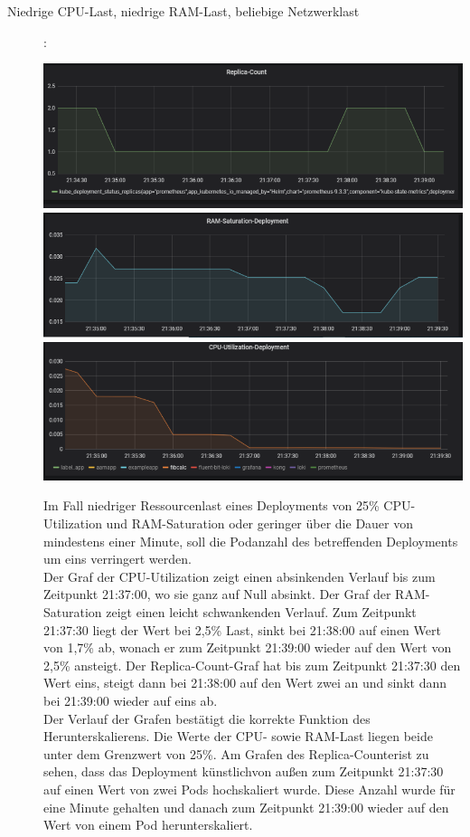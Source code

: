 \documentclass[a4paper,10pt]{scrartcl}
\begin{document}
\begin{description}

\item[Niedrige CPU-Last, niedrige RAM-Last, beliebige Netzwerklast]:\\

\begin{minipage}{\linewidth}
            \includegraphics[width=.5\textwidth]{img/Herunterskalieren/ReplicaCount.PNG}
            \includegraphics[scale=1,width=.5\textwidth,height=.14\textheight]{img/Herunterskalieren/RAMSaturation.PNG}
  			\includegraphics[scale=1,width=.5\textwidth]{img/Herunterskalieren/CPUSaturation.PNG}			
\end{minipage}

Im Fall niedriger Ressourcenlast eines Deployments von 25\% CPU-Utilization und RAM-Saturation oder geringer über die Dauer von mindestens einer Minute, soll die Podanzahl des betreffenden Deployments um eins verringert werden.\\
Der Graf der CPU-Utilization zeigt einen absinkenden Verlauf bis zum Zeitpunkt 21:37:00, wo sie ganz auf Null absinkt. Der Graf der RAM-Saturation zeigt einen leicht schwankenden Verlauf. Zum Zeitpunkt 21:37:30 liegt der Wert bei 2,5\% Last, sinkt bei 21:38:00 auf einen Wert von 1,7\% ab, wonach er zum Zeitpunkt 21:39:00 wieder auf den Wert von 2,5\% ansteigt.
Der \glqq Replica-Count\grqq -Graf hat bis zum Zeitpunkt 21:37:30 den Wert eins, steigt dann bei 21:38:00 auf den Wert zwei an und sinkt dann bei 21:39:00 wieder auf eins ab.\\
Der Verlauf der Grafen bestätigt die korrekte Funktion des Herunterskalierens. Die Werte der CPU- sowie RAM-Last liegen beide unter dem Grenzwert von 25\%. Am Grafen des \glqq Replica-Counter\grqq ist zu sehen, dass das Deployment \glqq künstlich\grqq von außen zum Zeitpunkt 21:37:30 auf einen Wert von zwei Pods hochskaliert wurde. Diese Anzahl wurde für eine Minute gehalten und danach zum Zeitpunkt 21:39:00 wieder auf den Wert von einem Pod herunterskaliert.

\end{description}
\end{document}
